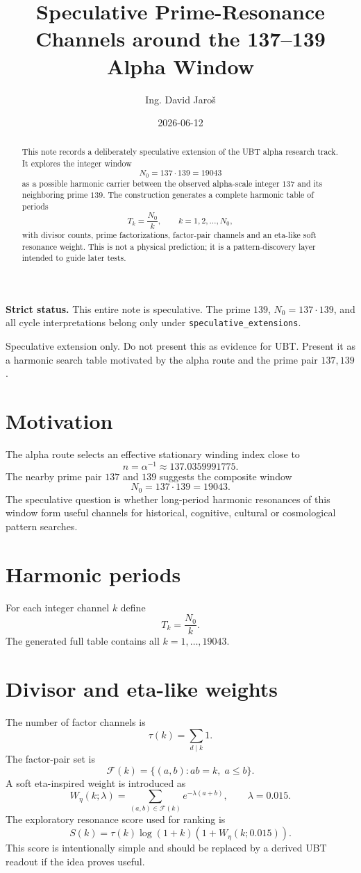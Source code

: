 \documentclass[12pt,a4paper]{article}
\title{Speculative Prime-Resonance Channels around the 137--139 Alpha Window}
\author{Ing. David Jaro\v{s}}
\date{2026-06-12}
\begin{document}
\textbf{Strict status.} This entire note is speculative. The prime $139$, $N_0=137\cdot139$, and all cycle interpretations belong only under \texttt{speculative\_extensions}.

\maketitle

\begin{abstract}
This note records a deliberately speculative extension of the UBT alpha research track.  It explores the integer window
\[
N_0=137\cdot139=19043
\]
as a possible harmonic carrier between the observed alpha-scale integer $137$ and its neighboring prime $139$.  The construction generates a complete harmonic table of periods
\[
T_k=\frac{N_0}{k},\qquad k=1,2,\ldots,N_0,
\]
with divisor counts, prime factorizations, factor-pair channels and an eta-like soft resonance weight.  This is not a physical prediction; it is a pattern-discovery layer intended to guide later tests.
\end{abstract}

\begin{tcolorbox}[title=Status]
Speculative extension only.  Do not present this as evidence for UBT.  Present it as a harmonic search table motivated by the alpha route and the prime pair $137,139$.
\end{tcolorbox}

\section{Motivation}
The alpha route selects an effective stationary winding index close to
\[
n=\alpha^{-1}\approx137.0359991775.
\]
The nearby prime pair $137$ and $139$ suggests the composite window
\[
N_0=137\cdot139=19043.
\]
The speculative question is whether long-period harmonic resonances of this window form useful channels for historical, cognitive, cultural or cosmological pattern searches.

\section{Harmonic periods}
For each integer channel $k$ define
\[
T_k=\frac{N_0}{k}.
\]
The generated full table contains all $k=1,\ldots,19043$.

\section{Divisor and eta-like weights}
The number of factor channels is
\[
\tau(k)=\sum_{d\mid k}1.
\]
The factor-pair set is
\[
\mathcal F(k)=\{(a,b):ab=k,\;a\le b\}.
\]
A soft eta-inspired weight is introduced as
\[
W_\eta(k;\lambda)=\sum_{(a,b)\in\mathcal F(k)}e^{-\lambda(a+b)},
\qquad \lambda=0.015.
\]
The exploratory resonance score used for ranking is
\[
S(k)=\tau(k)\log(1+k)(1+W_\eta(k;0.015)).
\]
This score is intentionally simple and should be replaced by a derived UBT readout if the idea proves useful.
\end{document}
